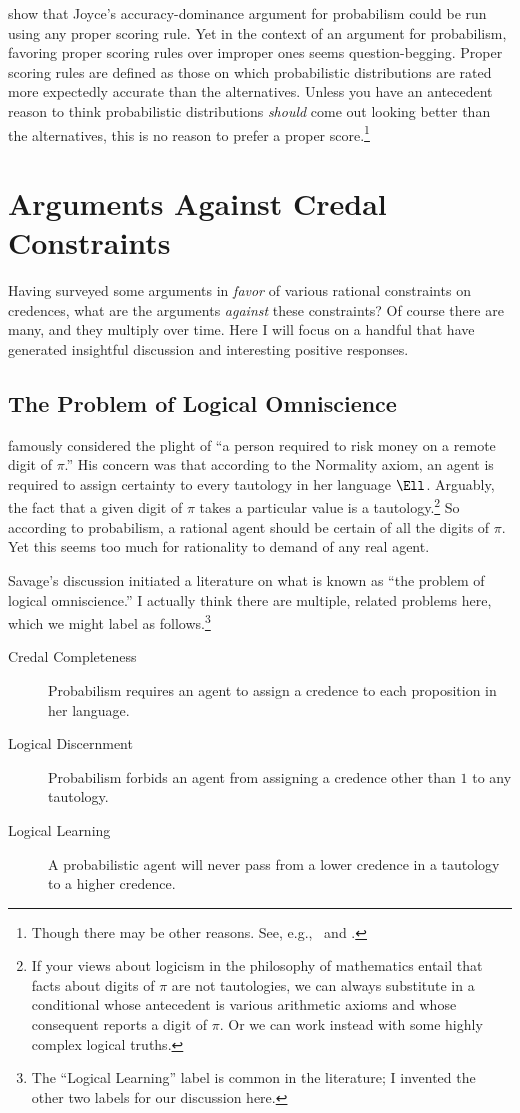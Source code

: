 \citet{Predd} show that Joyce's accuracy-dominance argument for probabilism could be run using any proper scoring rule. Yet in the context of an argument for probabilism, favoring proper scoring rules over improper ones seems question-begging. Proper scoring rules are defined as those on which probabilistic distributions are rated more expectedly accurate than the alternatives. Unless you have an antecedent reason to think probabilistic distributions \emph{should} come out looking better than the alternatives, this is no reason to prefer a proper score.\footnote
{Though there may be other reasons. See, e.g.,\ \citet{JoyceAccuracy} and \citet{PettigrewLaws}.}

 
\section{Arguments Against Credal Constraints}
Having surveyed some arguments in \emph{favor} of various rational constraints on credences, what are the arguments \emph{against} these constraints? Of course there are many, and they multiply over time. Here I will focus on a handful that have generated insightful discussion and interesting positive responses.

\subsection{The Problem of Logical Omniscience} \label{ss:omni}
\citet{SavageDifficulties} famously considered the plight of ``a person required to risk money on a remote digit of $\pi$.'' His concern was that according to the Normality axiom, an agent is required to assign certainty to every tautology in her language $\Ell$. Arguably, the fact that a given digit of $\pi$ takes a particular value is a tautology.\footnote
{If your views about logicism in the philosophy of mathematics entail that facts about digits of $\pi$ are not tautologies, we can always substitute in a conditional whose antecedent is various arithmetic axioms and whose consequent reports a digit of $\pi$. Or we can work instead with some highly complex logical truths.}
 So according to probabilism, a rational agent should be certain of all the digits of $\pi$. Yet this seems too much for rationality to demand of any real agent.

Savage's discussion initiated a literature on what is known as ``the problem of logical omniscience.'' I actually think there are multiple, related problems here, which we might label as follows.\footnote{The ``Logical Learning'' label is common in the literature; I invented the other two labels for our discussion here.}
\begin{description}
\item[Credal Completeness]{Probabilism requires an agent to assign a credence to each proposition in her language.}
\item[Logical Discernment]{Probabilism forbids an agent from assigning a credence other than $1$ to any tautology.}
\item[Logical Learning]{A probabilistic agent will never pass from a lower credence in a tautology to a higher credence.} 
\end{description}

